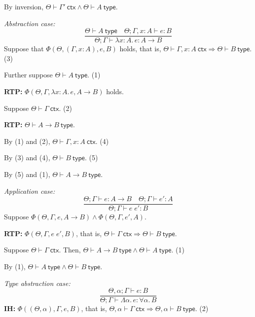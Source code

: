 \documentclass[10pt,\jkfside,a4paper]{article}
\begin{document}
\begin{enumerate}
\begin{enumerate}
{            By inversion, $\Theta \vdash \Gamma'\ \mathsf{ctx} \wedge \Theta \vdash A\ \mathsf{type}$.

            \textit{Abstraction case:}
            \[
                \frac{\Theta \vdash A\ \mathsf{type} \quad \Theta ; \Gamma, x : A \vdash e : B}{\Theta ; \Gamma \vdash \lambda x : A.\, e : A \to B}
            \]
            Suppose that $\Phi(\Theta, (\Gamma, x : A), e, B)$ holds, that is, $\Theta \vdash \Gamma, x : A\ \mathsf{ctx} \Rightarrow \Theta \vdash B\ \mathsf{type}$. \hfill (3)

            Further suppose $\Theta \vdash A\ \mathsf{type}$. \hfill (1)

            \textbf{RTP:} $\Phi(\Theta, \Gamma, \lambda x : A.\, e, A \to B)$ holds.

            Suppose $\Theta \vdash \Gamma\ \mathsf{ctx}$. \hfill (2)

            \textbf{RTP:} $\Theta \vdash A \to B\ \mathsf{type}$.

            By (1) and (2), $\Theta \vdash \Gamma, x : A\ \mathsf{ctx}$. \hfill (4)

            By (3) and (4), $\Theta \vdash B\ \mathsf{type}$. \hfill (5)

            By (5) and (1), $\Theta \vdash A \to B\ \mathsf{type}$.

            \textit{Application case:}
            \[
                \frac{\Theta ; \Gamma \vdash e : A \to B \quad \Theta ; \Gamma \vdash e' : A}{\Theta ; \Gamma \vdash e\;e' : B}
            \]
            Suppose $\Phi(\Theta, \Gamma, e, A \to B) \wedge \Phi(\Theta, \Gamma, e', A)$.

            \textbf{RTP:} $\Phi(\Theta, \Gamma, e\;e', B)$, that is, $\Theta \vdash \Gamma\ \mathsf{ctx} \Rightarrow \Theta \vdash B\ \mathsf{type}$.

            Suppose $\Theta \vdash \Gamma\ \mathsf{ctx}$. Then, $\Theta \vdash A \to B\ \mathsf{type} \wedge \Theta \vdash A\ \mathsf{type}$. \hfill (1)

            By (1), $\Theta \vdash A\ \mathsf{type} \wedge \Theta \vdash B\ \mathsf{type}$.

            \textit{Type abstraction case:}
            \[
                \frac{\Theta, \alpha ; \Gamma \vdash e : B}{\Theta ; \Gamma \vdash \Lambda \alpha.\, e : \forall \alpha.\, B}
            \]
            \textbf{IH:} $\Phi((\Theta, \alpha), \Gamma, e, B)$, that is, $\Theta, \alpha \vdash \Gamma\ \mathsf{ctx} \Rightarrow \Theta, \alpha \vdash B\ \mathsf{type}$. \hfill (2)

}
\end{enumerate}
\end{enumerate}
\end{document}

